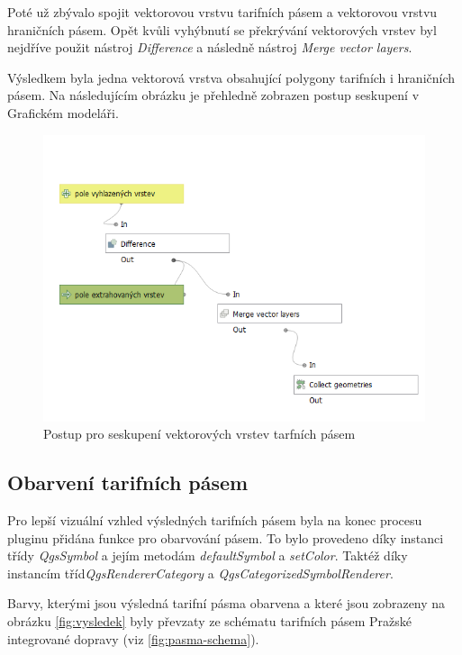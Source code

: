 Poté už zbývalo spojit vektorovou vrstvu tarifních pásem a vektorovou vrstvu hraničních pásem. Opět kvůli vyhýbnutí se 
překrývání vektorových vrstev byl nejdříve použit nástroj \textit{Difference} a následně nástroj  \textit{Merge vector layers}.

Výsledkem byla jedna vektorová vrstva obsahující polygony tarifních i hraničních pásem. Na následujícím obrázku
je přehledně zobrazen postup seskupení v Grafickém modeláři.

\begin{figure}[H] \centering
    \includegraphics[width=400pt]{./pictures/postup-collecting.png}
    \caption[Postup pro seskupení vektorových vrstev tarfních pásem]{Postup pro seskupení vektorových vrstev tarfních pásem}
	\label{fig:postup-collecting}              
\end{figure}

\subsection{Obarvení tarifních pásem}

Pro lepší vizuální vzhled výsledných tarifních pásem byla na konec procesu pluginu přidána funkce
pro obarvování pásem. To bylo provedeno díky instanci třídy \textit{QgsSymbol} a jejím metodám 
\textit{defaultSymbol} a \textit{setColor}. Taktéž díky instancím tříd\textit{QgsRendererCategory}
a \textit{QgsCategorizedSymbolRenderer}.

Barvy, kterými jsou výsledná tarifní pásma obarvena a které jsou zobrazeny na obrázku \ref{fig:vysledek} byly převzaty
ze schématu tarifních pásem Pražské integrované dopravy (viz \ref{fig:pasma-schema}).  

